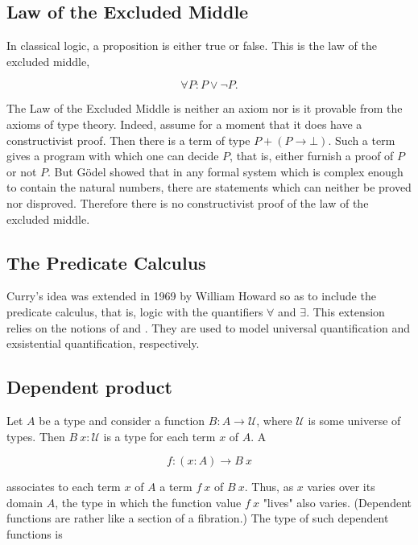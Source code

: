 \subsection{Law of the Excluded Middle}

In classical logic, a proposition is either true or false.  This is the law of the excluded middle, 

\begin{equation}
\label{LEM}
\forall P: P \lor \neg P.
\end{equation}

The Law of the Excluded Middle  is neither an axiom nor is it provable from the axioms of type theory. Indeed, assume for a moment that it does have a constructivist proof. Then there is a term of type $P + (P \to \bot)$.  Such a term gives a program with which one can decide $P$, that is, either furnish a proof of $P$ or not $P$.  But Gödel showed that in any formal system which is complex enough to contain the natural numbers, there are statements which can neither be proved nor disproved.  Therefore there is no constructivist proof of the law of the excluded middle.


\subsection{The Predicate Calculus}

 Curry's idea was extended in 1969 by William Howard so as to include the predicate calculus, that is, logic with the quantifiers $\forall$ and $\exists$.  This extension relies on the notions of   and .  They are used to model universal quantification  and exsistential quantification, respectively.



\subsection{Dependent product}

Let $A$ be a type and consider a function $B : A \to \mathcal{U}$, where $\mathcal{U}$ is some universe of types. Then $B\ x : \mathcal{U}$ is a type for each term $x$ of $A$.  A 

\begin{equation}
f  : (x : A) \to B\ x
\end{equation}

associates to each term $x$ of $A$ a term $f\ x$ of $B\ x$.  Thus, as $x$ varies over its domain $A$, the type in which the function value $f\ x$ "lives" also varies. (Dependent functions are rather like a section of a fibration.) The type of such dependent functions is 

